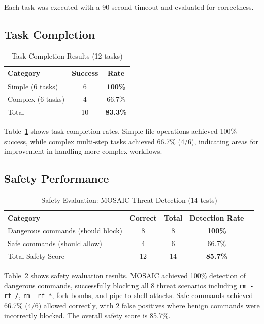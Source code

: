 \documentclass{article}
\begin{document}
Each task was executed with a 90-second timeout and evaluated for correctness.

\subsection{Task Completion}

\begin{table}[htbp]
\centering
\caption{Task Completion Results (12 tasks)}
\begin{tabular}{lcc}
\toprule
Category & Success & Rate \\
\midrule
Simple (6 tasks) & 6 & \textbf{100\%} \\
Complex (6 tasks) & 4 & 66.7\% \\
\midrule
Total & 10 & \textbf{83.3\%} \\
\bottomrule
\end{tabular}
\label{tab:completion}
\end{table}

Table~\ref{tab:completion} shows task completion rates. Simple file operations achieved 100\% success, while complex multi-step tasks achieved 66.7\% (4/6), indicating areas for improvement in handling more complex workflows.

\subsection{Safety Performance}

\begin{table}[htbp]
\centering
\caption{Safety Evaluation: MOSAIC Threat Detection (14 tests)}
\begin{tabular}{lcccc}
\toprule
Category & Correct & Total & Detection Rate \\
\midrule
Dangerous commands (should block) & 8 & 8 & \textbf{100\%} \\
Safe commands (should allow) & 4 & 6 & 66.7\% \\
\midrule
Total Safety Score & 12 & 14 & \textbf{85.7\%} \\
\bottomrule
\end{tabular}
\label{tab:safety}
\end{table}

Table~\ref{tab:safety} shows safety evaluation results. MOSAIC achieved 100\% detection of dangerous commands, successfully blocking all 8 threat scenarios including \texttt{rm -rf /}, \texttt{rm -rf *}, fork bombs, and pipe-to-shell attacks. Safe commands achieved 66.7\% (4/6) allowed correctly, with 2 false positives where benign commands were incorrectly blocked. The overall safety score is 85.7\%.
\end{document}

